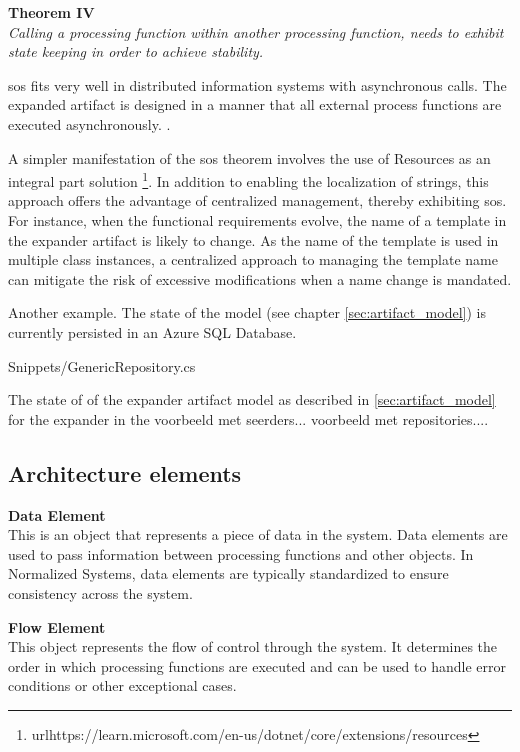 \begin{center}
    \textbf{Theorem IV}\\
    \textit{Calling a processing function within another processing function, needs to exhibit state keeping in order to achieve stability.}
\end{center}

\gls{sos} fits very well in distributed information systems with asynchronous calls. The
expanded artifact is designed in a manner that all external process functions are executed
asynchronously. .

A simpler manifestation of the \gls{sos} theorem involves the use of Resources as an
integral part solution
\footnote{url{https://learn.microsoft.com/en-us/dotnet/core/extensions/resources}}. In
addition to enabling the localization of strings, this approach offers the advantage of
centralized management, thereby exhibiting \gls{sos}. For instance, when the functional
requirements evolve, the name of a template in the expander artifact is likely to change.
As the name of the template is used in multiple class instances, a centralized approach to
managing the template name can mitigate the risk of excessive modifications when a name
change is mandated.

Another example. The state of the model (see chapter \ref{sec:artifact_model}) is
currently persisted in an Azure SQL Database.


    {Snippets/GenericRepository.cs}

The state of of the expander artifact model as described in \ref{sec:artifact_model} for the expander in the 
voorbeeld met seerders...
voorbeeld met repositories....



\subsection{Architecture elements} \label{subsec:ns_elements} 

\textbf{Data Element}\\
This is an object that represents a piece of data in the system. Data elements are used to
pass information between processing functions and other objects. In Normalized Systems,
data elements are typically standardized to ensure consistency across the system.

\textbf{Flow Element}\\
This object represents the flow of control through the system. It determines the order in
which processing functions are executed and can be used to handle error conditions or
other exceptional cases.

